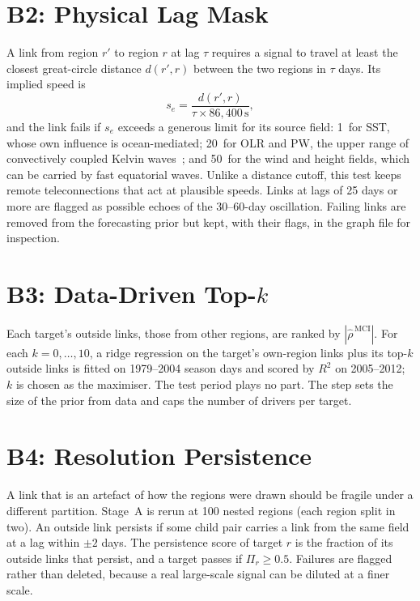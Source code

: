 \section{B2: Physical Lag Mask}
\label{sec:val-b2}

A link from region $r'$ to region $r$ at lag $\tau$ requires a signal to travel at least the closest great-circle distance $d(r',r)$ between the two regions in $\tau$ days. Its implied speed is
\begin{equation}
  s_e=\frac{d(r',r)}{\tau\times 86{,}400\,\mathrm{s}},
  \label{eq:speed}
\end{equation}
and the link fails if $s_e$ exceeds a generous limit for its source field: 1\ms\ for SST, whose own influence is ocean-mediated; 20\ms\ for OLR and PW, the upper range of convectively coupled Kelvin waves~\cite{kiladis2009convectively}; and 50\ms\ for the wind and height fields, which can be carried by fast equatorial waves. Unlike a distance cutoff, this test keeps remote teleconnections that act at plausible speeds. Links at lags of 25 days or more are flagged as possible echoes of the 30--60-day oscillation. Failing links are removed from the forecasting prior but kept, with their flags, in the graph file for inspection.

\section{B3: Data-Driven Top-\texorpdfstring{$k$}{k}}
\label{sec:val-b3}

Each target's outside links, those from other regions, are ranked by $|\hat\rho^{\,\mathrm{MCI}}|$. For each $k=0,\dots,10$, a ridge regression on the target's own-region links plus its top-$k$ outside links is fitted on 1979--2004 season days and scored by $R^2$ on 2005--2012; $k$ is chosen as the maximiser. The test period plays no part. The step sets the size of the prior from data and caps the number of drivers per target.

\section{B4: Resolution Persistence}
\label{sec:val-b4}

A link that is an artefact of how the regions were drawn should be fragile under a different partition. Stage~A is rerun at 100 nested regions (each region split in two). An outside link persists if some child pair carries a link from the same field at a lag within $\pm2$ days. The persistence score of target $r$ is the fraction of its outside links that persist, and a target passes if $\Pi_r\ge0.5$. Failures are flagged rather than deleted, because a real large-scale signal can be diluted at a finer scale.


